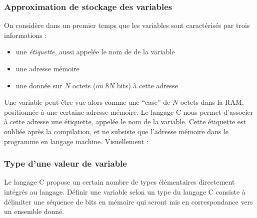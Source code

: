 \documentclass[../../../main.tex]{subfiles}
\begin{document}
\subsubsection{Approximation de stockage des variables}
 
On considère dans un premier temps que les variables sont caractérisés par trois informations :
\begin{itemize}
	\item une \textit{étiquette}, aussi appelée le nom de de la variable
	\item une adresse mémoire
	\item une donnée sur $N$ octets (ou $8N$ bits) à cette adresse
\end{itemize}
Une variable peut être vue alors comme une ``case'' de $N$ octets dans la RAM, positionnée à une certaine adresse mémoire. Le langage C nous permet d'associer à cette adresse une étiquette, appelée le nom de la variable. Cette étiquette est oubliée après la compilation, et ne subsiste que l'adresse mémoire dans le programme en langage machine.\newline
Visuellement :

\begin{minipage}{\textwidth}
	\begin{center}
		
		\label{img:variable}
	\end{center}
\end{minipage}
 
\subsubsection{Type d'une valeur de variable}
Le langage C propose un certain nombre de types élémentaires directement intégrés au langage. Définir une variable selon un type du langage C consiste à délimiter une séquence de bits en mémoire qui seront mis en correspondance vers un ensemble donné.
\end{document}

